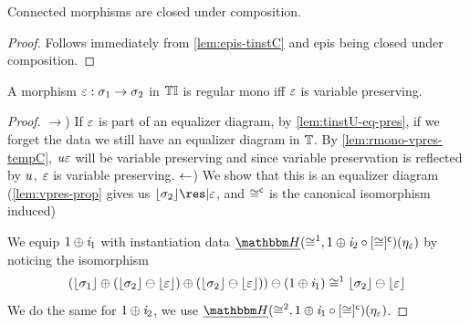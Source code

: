 \begin{lemma}
    Connected morphisms are closed under composition.
\end{lemma}
\begin{proof}
    Follows immediately from \cref{lem:epis-tinstC} and epis being closed under composition.
\end{proof}

\begin{lemma}\label{lem:rmono-dcon-tinstC}
    A morphism $\varepsilon : \sigma_1 \to \sigma_2$ in ${\mathbb{T}\mathbb{I}}$ is regular mono iff $\varepsilon$ is variable preserving.
\end{lemma}
\begin{proof}\nl
    $\to$) If $\varepsilon$ is part of an equalizer diagram, by \cref{lem:tinstU-eq-pres}, if we forget the data we still have an equalizer diagram in $\mathbb{T}$.
           By \cref{lem:rmono-vpres-tempC}, $\mathit{u}\varepsilon$ will be variable preserving and since variable preservation is reflected by $\mathit{u}$, $\varepsilon$ is variable preserving.\nl
    \def\ciso{\iso^{\mathsf{c}}}
    \def\isoO{\iso^1}
    \def\isoT{\iso^2}
    $\leftarrow$) 
    We show that this is an equalizer diagram (\cref{lem:vpres-prop} gives us $\concL{\sigma_2}\res|\me$, and $\ciso$ is the canonical isomorphism induced)
    \begin{center}
    \end{center}
    We equip $1 \oplus \mathit{i}_1$ with instantiation data $\dheapF(\isoO, 1 \oplus \incl_2 \comp \anyL\ciso)(\mvarM_\me)$ by noticing the isomorphism
    \[ (\concL{\sigma_1} \mplus (\concL{\sigma_2} \ominus \concL\me) \mplus (\concL{\sigma_2} \ominus \concL\me)) \ominus (1 \oplus \incl_1)
        \isoO \concL{\sigma_2} \ominus \concL\me \]
    We do the same for $1 \oplus \mathit{i}_2$, \ie we use $\dheapF(\isoT, 1 \oplus \incl_1 \comp \anyL\ciso)(\mvarM_\me)$.


\end{proof}
